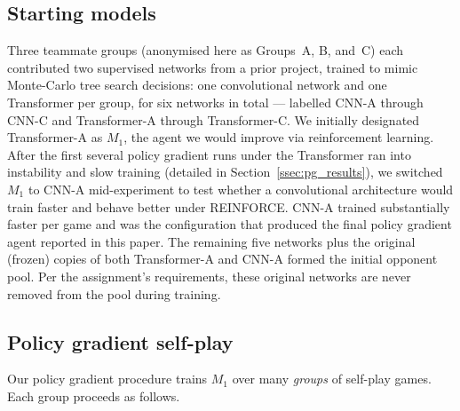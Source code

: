 \documentclass[11pt]{article}
\begin{document}
\subsection{Starting models}
\label{ssec:start}

Three teammate groups (anonymised here as Groups~A, B, and~C) each
contributed two supervised networks from a prior project, trained to
mimic Monte-Carlo tree search decisions: one convolutional network and
one Transformer per group, for six networks in total — labelled CNN-A
through CNN-C and Transformer-A through Transformer-C. We initially
designated Transformer-A as $M_1$, the agent we would improve via
reinforcement learning. After the first several policy gradient runs
under the Transformer ran into instability and slow training (detailed
in Section~\ref{ssec:pg_results}), we switched $M_1$ to CNN-A
mid-experiment to test whether a convolutional architecture would
train faster and behave better under REINFORCE. CNN-A trained
substantially faster per game and was the configuration that produced
the final policy gradient agent reported in this paper. The remaining
five networks plus the original (frozen) copies of both Transformer-A
and CNN-A formed the initial opponent pool. Per the assignment's
requirements, these original networks are never removed from the pool
during training.

\subsection{Policy gradient self-play}
\label{ssec:pg}

Our policy gradient procedure trains $M_1$ over many \emph{groups} of
self-play games. Each group proceeds as follows.
\end{document}
